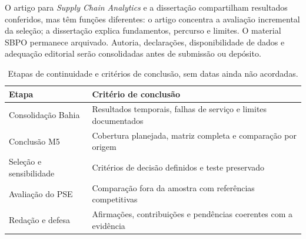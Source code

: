 O artigo para \textit{Supply Chain Analytics} e a dissertação compartilham resultados conferidos, mas têm funções diferentes: o artigo concentra a avaliação incremental da seleção; a dissertação explica fundamentos, percurso e limites. O material SBPO permanece arquivado. Autoria, declarações, disponibilidade de dados e adequação editorial serão consolidadas antes de submissão ou depósito.

\begin{table}[htbp]
\centering\small
\caption{Etapas de continuidade e critérios de conclusão, sem datas ainda não acordadas.}
\label{tab:cronograma}
\begin{tabular}{@{}p{4.1cm}p{8.9cm}@{}}\toprule
Etapa & Critério de conclusão\\\midrule
Consolidação Bahia & Resultados temporais, falhas de serviço e limites documentados\\
Conclusão M5 & Cobertura planejada, matriz completa e comparação por origem\\
Seleção e sensibilidade & Critérios de decisão definidos e teste preservado\\
Avaliação do PSE & Comparação fora da amostra com referências competitivas\\
Redação e defesa & Afirmações, contribuições e pendências coerentes com a evidência\\
\bottomrule\end{tabular}
\end{table}
